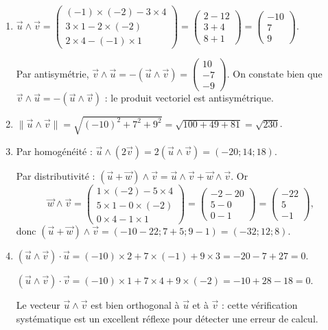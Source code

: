 \documentclass[11pt]{article}
\begin{document}
\begin{corrige}
\begin{enumerate}
\item $\vec{u} \wedge \vec{v} = \begin{pmatrix} (-1)\times(-2) - 3\times 4 \\ 3\times 1 - 2\times(-2) \\ 2\times 4 - (-1)\times 1 \end{pmatrix} = \begin{pmatrix} 2-12 \\ 3+4 \\ 8+1 \end{pmatrix} = \begin{pmatrix} -10 \\ 7 \\ 9 \end{pmatrix}$.

Par antisymétrie, $\vec{v} \wedge \vec{u} = -(\vec{u} \wedge \vec{v}) = \begin{pmatrix} 10 \\ -7 \\ -9 \end{pmatrix}$. On constate bien que $\vec{v} \wedge \vec{u} = -(\vec{u} \wedge \vec{v})$ : le produit vectoriel est antisymétrique.
\item $\|\vec{u} \wedge \vec{v}\| = \sqrt{(-10)^2 + 7^2 + 9^2} = \sqrt{100 + 49 + 81} = \sqrt{230}$.
\item Par homogénéité : $\vec{u} \wedge (2\vec{v}) = 2(\vec{u} \wedge \vec{v}) = (-20 ; 14 ; 18)$.

Par distributivité : $(\vec{u} + \vec{w}) \wedge \vec{v} = \vec{u} \wedge \vec{v} + \vec{w} \wedge \vec{v}$. Or
\[ \vec{w} \wedge \vec{v} = \begin{pmatrix} 1\times(-2) - 5\times 4 \\ 5\times 1 - 0\times(-2) \\ 0\times 4 - 1\times 1 \end{pmatrix} = \begin{pmatrix} -2-20 \\ 5-0 \\ 0-1 \end{pmatrix} = \begin{pmatrix} -22 \\ 5 \\ -1 \end{pmatrix}, \]
donc $(\vec{u} + \vec{w}) \wedge \vec{v} = (-10 - 22 ; 7 + 5 ; 9 - 1) = (-32 ; 12 ; 8)$.
\item $(\vec{u} \wedge \vec{v}) \cdot \vec{u} = (-10)\times 2 + 7\times(-1) + 9\times 3 = -20 - 7 + 27 = 0$.

$(\vec{u} \wedge \vec{v}) \cdot \vec{v} = (-10)\times 1 + 7\times 4 + 9\times(-2) = -10 + 28 - 18 = 0$.

Le vecteur $\vec{u} \wedge \vec{v}$ est bien orthogonal à $\vec{u}$ et à $\vec{v}$ : cette vérification systématique est un excellent réflexe pour détecter une erreur de calcul.
\end{enumerate}
\end{corrige}
\end{document}
